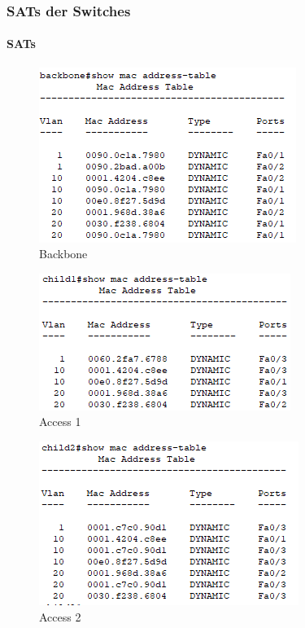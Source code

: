 \subsubsection{SATs der Switches}
\paragraph{SATs}
\begin{figure}[!htb]
    \centering
    \includegraphics[width=.8\textwidth,keepaspectratio]{./img/SAT/BB.png}
    \caption{Backbone}
\end{figure}
\begin{figure}[!htb]
    \centering
    \includegraphics[width=.8\textwidth,keepaspectratio]{./img/SAT/S1.png}
    \caption{Access 1}
\end{figure}
\begin{figure}[!htb]
    \centering
    \includegraphics[width=.8\textwidth,keepaspectratio]{./img/SAT/S2.png}
    \caption{Access 2}
\end{figure}
\FloatBarrier


